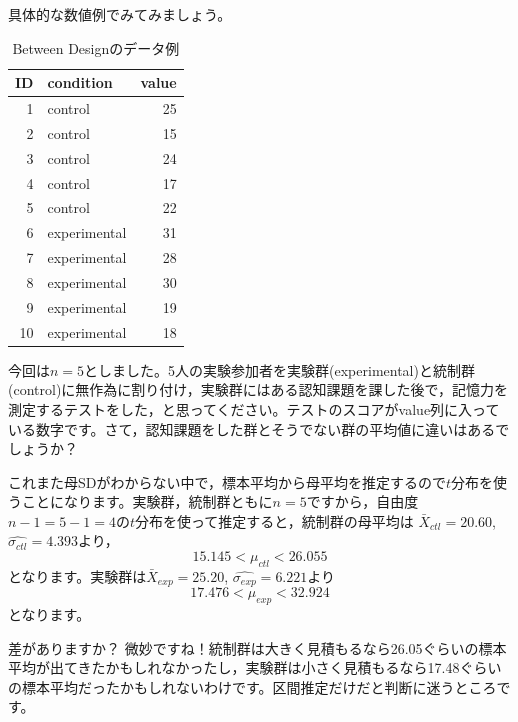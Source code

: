 \documentclass{ltjsbook}
\begin{document}
具体的な数値例でみてみましょう。
\begin{table}[ht]
	\centering
	\caption{Between Designのデータ例}
	\begin{tabular}{rlr}
		\hline
		ID & condition    & value \\
		\hline
		1  & control      & 25    \\
		2  & control      & 15    \\
		3  & control      & 24    \\
		4  & control      & 17    \\
		5  & control      & 22    \\
		6  & experimental & 31    \\
		7  & experimental & 28    \\
		8  & experimental & 30    \\
		9  & experimental & 19    \\
		10 & experimental & 18    \\
		\hline
	\end{tabular}
	\label{tbl:16_02}
\end{table}
今回は$n=5$としました。5人の実験参加者を実験群(experimental)と統制群(control)に無作為に割り付け，実験群にはある認知課題を課した後で，記憶力を測定するテストをした，と思ってください。テストのスコアがvalue列に入っている数字です。さて，認知課題をした群とそうでない群の平均値に違いはあるでしょうか？

これまた母SDがわからない中で，標本平均から母平均を推定するので$t$分布を使うことになります。実験群，統制群ともに$n=5$ですから，自由度$n-1=5-1=4$の$t$分布を使って推定すると，統制群の母平均は
$\bar{X}_{ctl} =20.60$,$\hat{\sigma_{ctl}}=4.393$より，
\[15.145 < \mu_{ctl}<26.055 \]
となります。実験群は$\bar{X}_{exp} = 25.20$,
$\hat{\sigma_{exp}}=6.221$より
\[17.476<\mu_{exp}< 32.924 \]
となります。

差がありますか？ 微妙ですね！統制群は大きく見積もるなら26.05ぐらいの標本平均が出てきたかもしれなかったし，実験群は小さく見積もるなら17.48ぐらいの標本平均だったかもしれないわけです。区間推定だけだと判断に迷うところです。
\end{document}

